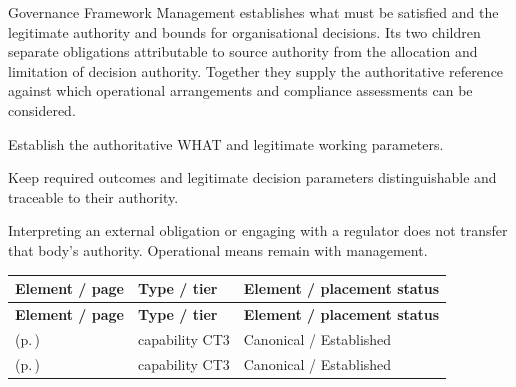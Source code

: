 Governance Framework Management establishes what must be satisfied and the legitimate authority and bounds for organisational decisions. Its two children separate obligations attributable to source authority from the allocation and limitation of decision authority. Together they supply the authoritative reference against which operational arrangements and compliance assessments can be considered.



Establish the authoritative WHAT and legitimate working parameters.



Keep required outcomes and legitimate decision parameters distinguishable and traceable to their authority.



Interpreting an external obligation or engaging with a regulator does not transfer that body's authority. Operational means remain with management.


\begingroup\small\setlength{\TableWidth}{\dimexpr\linewidth-6\tabcolsep-4\arrayrulewidth\relax}
\begin{longtable}{|>{\raggedright\arraybackslash}p{0.52\TableWidth}|>{\raggedright\arraybackslash}p{0.2\TableWidth}|>{\raggedright\arraybackslash}p{0.28\TableWidth}|}
\hline\rowcolor{TableHead}\textbf{Element / page} & \textbf{Type / tier} & \textbf{Element / placement status}\\\hline\endfirsthead
\hline\rowcolor{TableHead}\textbf{Element / page} & \textbf{Type / tier} & \textbf{Element / placement status}\\\hline\endhead
\hline\endfoot
\nameref{cap:bc-policy-obligation-governance} (p.\,\pageref{cap:bc-policy-obligation-governance}) & capability CT3 & Canonical / Established\\\hline
\nameref{cap:bc-authority-constraint-governance} (p.\,\pageref{cap:bc-authority-constraint-governance}) & capability CT3 & Canonical / Established\\\hline
\end{longtable}\endgroup

